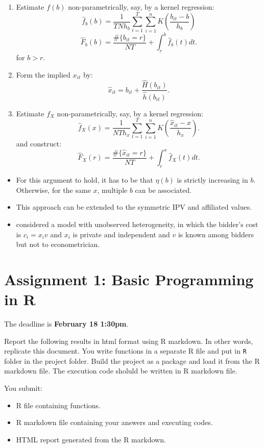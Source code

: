 \documentclass[]{book}
\providecommand{\tightlist}{%
  \setlength{\itemsep}{0pt}\setlength{\parskip}{0pt}}
\begin{document}
\begin{enumerate}
\def\labelenumi{\arabic{enumi}.}
\tightlist
\item
  Estimate \(f(b)\) non-parametrically, say, by a kernel regression: \[
  \hat{f}_b(b) = \frac{1}{TN h_b}\sum_{t = 1}^T \sum_{i = 1}^n K\left(\frac{b_{it} - b}{h_b}\right)
  \] \[
  \widehat{F}_b(b) = \frac{\#\{b_{it} = r\}}{NT} +  \int_{r}^b \hat{f}_b(t) dt.
  \] for \(b > r\).
\item
  Form the implied \(x_{it}\) by: \[
  \hat{x}_{it} = b_{it} + \frac{\widehat{H}(b_{it})}{\hat{h}(b_{it})}.
  \]
\item
  Estimate \(f_X\) non-parametrically, say, by a kernel regression: \[
  \hat{f}_X(x) = \frac{1}{NT h_x} \sum_{t = 1}^T \sum_{i = 1}^n K\left(\frac{\hat{x}_{it} - x}{h_x}\right).
  \] and construct: \[
  \widehat{F}_X(r) = \frac{\#\{\hat{x}_{it} = r\}}{NT} + \int_r^x \hat{f}_X(t) dt.
  \]
\end{enumerate}

\begin{itemize}
\tightlist
\item
  For this argument to hold, it has to be that \(\eta(b)\) is strictly
  increasing in \(b\). Otherwise, for the same \(x\), multiple \(b\) can
  be associated.
\item
  This approach can be extended to the symmetric IPV and affiliated
  values.
\item
  \citet{krasnokutskayaIdentificationEstimationAuction2011} considered a
  model with unobserved heterogeneity, in which the bidder's cost is
  \(c_i = x_i v\) and \(x_i\) is private and independent and \(v\) is
  known among bidders but not to econometrician.
\end{itemize}

\chapter{Assignment 1: Basic Programming in R}\label{assignment1}

The deadline is \textbf{February 18 1:30pm}.

Report the following results in html format using R markdown. In other
words, replicate this document. You write functions in a separate R file
and put in \texttt{R} folder in the project folder. Build the project as
a package and load it from the R markdown file. The execution code
sholuld be written in R markdown file.

You submit:

\begin{itemize}
\tightlist
\item
  R file containing functions.
\item
  R markdown file containing your answers and executing codes.
\item
  HTML report generated from the R markdown.
\end{itemize}
\end{document}
